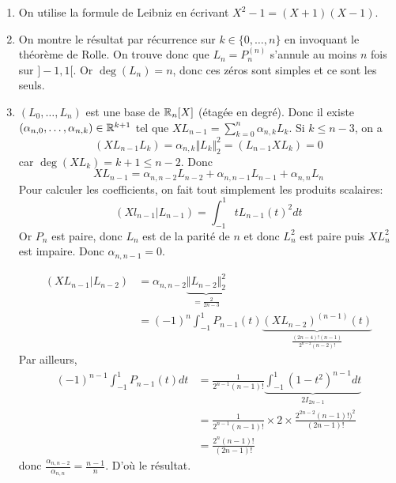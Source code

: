 \begin{solution}
\begin{enumerate}
		\item On utilise la formule de Leibniz en écrivant $X^{2}-1=(X+1)(X-1)$.
		\item On montre le résultat par récurrence sur $k\in\{0,\dots,n\}$ en invoquant le théorème de Rolle. On trouve donc que $L_{n}=P_{n}^{(n)}$ s'annule au moins $n$ fois sur $]-1,1[$. Or $\deg(L_{n})=n$, donc ces zéros sont simples et ce sont les seuls.
		\item $(L_{0},\dots,L_{n})$ est une base de $\mathbb{R}_{n}[X]$ (étagée en degré). Donc il existe $(\alpha_{n,0},\dots,\alpha_{n,k})\in\mathbb{R}^{k+1}$ tel que $XL_{n-1}=\sum_{k=0}^{n}\alpha_{n,k}L_{k}$. Si $k\leqslant n-3$, on a
		$$(XL_{n-1} L_{k})=\alpha_{n,k}\Vert L_{k}\Vert_{2}^{2}=(L_{n-1}XL_{k})=0$$
		car $\deg(XL_{k})=k+1\leqslant n-2$. Donc 
		$$XL_{n-1}=\alpha_{n,n-2}L_{n-2}+\alpha_{n,n-1}L_{n-1}+\alpha_{n,n}L_{n}$$
		Pour calculer les coefficients, on fait tout simplement les produits scalaires:
		$$(Xl_{n-1}|L_{n-1})=\int_{-1}^{1}tL_{n-1}(t)^{2}dt$$
		Or $P_{n}$ est paire, donc $L_{n}$ est de la parité de $n$ et donc $L_{n}^{2}$ est paire puis $XL_{n}^{2}$ est impaire. Donc $\alpha_{n,n-1}=0$.

		\begin{align*}
			(XL_{n-1}|L_{n-2})
			&=\alpha_{n,n-2}\underbrace{\Vert L_{n-2}\Vert_{2}^{2}}_{=\frac{2}{2n-3}}\\
			&=(-1)^{n}\int_{-1}^{1}P_{n-1}(t)\underbrace{(XL_{n-2})^{(n-1)}(t)}_{\frac{(2n-4)!(n-1)}{2^{n-2}(n-2)!}}
		\end{align*}
		Par ailleurs,
		\begin{align*}
			(-1)^{n-1}\int_{-1}^{1}P_{n-1}(t)dt
			&=\frac{1}{2^{n-1}(n-1)!}\underbrace{\int_{-1}^{1}(1-t^{2})^{n-1}dt}_{2I_{2n-1}}\\
			&=\frac{1}{2^{n-1}(n-1)!}\times 2\times\frac{2^{2n-2}(n-1)!)^{2}}{(2n-1)!}\\
			&=\frac{2^{n}(n-1)!}{(2n-1)!}
		\end{align*}
		donc $\frac{\alpha_{n,n-2}}{\alpha_{n,n}}=\frac{n-1}{n}$. D'où le résultat.
	\end{enumerate}
\end{solution}


